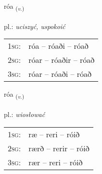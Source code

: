 \documentclass[frontgrid, backgrid]{flacards}\usepackage[]{graphicx}\usepackage[]{xcolor}
\begin{document}
\renewcommand{\flhead}{\vskip5pt \fboxsep=0pt {\small\bfseries\footnotesize Sagnorð | czasownik}}
\renewcommand{\fcfoot}{\vskip5pt \fboxsep=0pt \hspace{2pt}{\small\bfseries\footnotesize 3K}}

\renewcommand{\blhead}{\vskip5pt {\small\bfseries\footnotesize Sagnorð | czasownik }}
\renewcommand{\bcfoot}{\vskip5pt \hspace{2pt}{\small\bfseries\footnotesize 3K}}


{róa \small{\textsubscript{(\textit{v.})}} \\[1ex] %
\textphonetic{[rouːa]} \\
pl.: \emph{uciszyć, uspokoić} \\  [2ex]
\renewcommand*{\arraystretch}{0.8}
\begin{tabular}{p{1cm}l}
\textsc{1sg}: & róa -- róaði -- róað \\ 
\textsc{2sg}: & róar -- róaðir -- róað \\ 
\textsc{3sg}: & róar -- róaði -- róað \\ 
\end{tabular}
}

\renewcommand{\flhead}{\vskip5pt \fboxsep=0pt {\small\bfseries\footnotesize Sagnorð | czasownik}}
\renewcommand{\fcfoot}{\vskip5pt \fboxsep=0pt \hspace{2pt}{\small\bfseries\footnotesize 3K}}

\renewcommand{\blhead}{\vskip5pt {\small\bfseries\footnotesize Sagnorð | czasownik }}
\renewcommand{\bcfoot}{\vskip5pt \hspace{2pt}{\small\bfseries\footnotesize 3K}}


{róa \small{\textsubscript{(\textit{v.})}} \\[1ex] %
\textphonetic{[rouːa]} \\
pl.: \emph{wiosłować} \\  [2ex]
\renewcommand*{\arraystretch}{0.8}
\begin{tabular}{p{1cm}l}
\textsc{1sg}: & ræ -- reri -- róið \\ 
\textsc{2sg}: & rærð -- rerir -- róið \\ 
\textsc{3sg}: & rær -- reri -- róið \\ 
\end{tabular}
}
\end{document}
